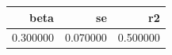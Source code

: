 \begin{tabular}{rrr}
\toprule
beta & se & r2 \\
\midrule
0.300000 & 0.070000 & 0.500000 \\
\bottomrule
\end{tabular}
